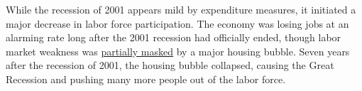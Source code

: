 \begin{minipage}{0.76\textwidth}
\small While the recession of 2001 appears mild by expenditure measures, it initiated a major decrease in labor force participation. The economy was losing jobs at an alarming rate long after the 2001 recession had officially ended, though labor market weakness was \href{https://www.aeaweb.org/articles?id=10.1257/jep.30.2.179}{partially masked} by a major housing bubble. Seven years after the recession of 2001, the housing bubble collapsed, causing the Great Recession and pushing many more people out of the labor force.
\end{minipage}
\vspace{1mm}

\begin{minipage}{0.32\textwidth}
\small  
\end{minipage} \hspace{5mm}
